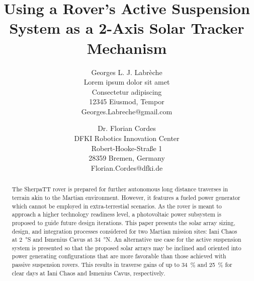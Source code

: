 \documentclass[twocolumn,letterpaper]{IEEEAerospaceCLS}  %
\begin{document}
\title{Using a Rover's Active Suspension System as a 2-Axis Solar Tracker Mechanism}

\author{%
Georges L. J. Labrèche\\
Lorem ipsum dolor sit amet\\
Consectetur adipiscing\\
12345 Eiusmod, Tempor\\
Georges.Labreche@gmail.com
\and
Dr. Florian Cordes\\
DFKI Robotics Innovation Center\\
Robert-Hooke-Straße 1\\
28359 Bremen, Germany\\
Florian.Cordes@dfki.de
}

\maketitle

\thispagestyle{plain}
\pagestyle{plain}


\begin{abstract}
The SherpaTT rover is prepared for further autonomous long distance traverses in terrain akin to the Martian environment. However, it features a fueled power generator which cannot be employed in extra-terrestial scenarios. As the rover is meant to approach a higher technology readiness level, a photovoltaic power subsystem is proposed to guide future design iterations. This paper presents the solar array sizing, design, and integration processes considered for two Martian mission sites: Iani Chaos at \SI{2}{\degree}S and Ismenius Cavus at \SI{34}{\degree}N. An alternative use case for the active suspension system is presented so that the proposed solar arrays may be inclined and oriented into power generating configurations that are more favorable than those achieved with passive suspension rovers. This results in traverse gains of up to \SI{34}{\percent} and \SI{25}{\percent} for clear days at Iani Chaos and Ismenius Cavus, respectively.
\end{abstract}
\end{document}
